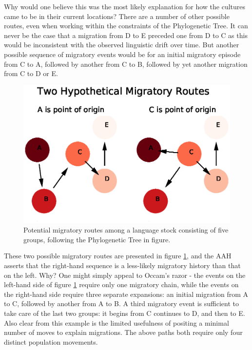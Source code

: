 \documentclass[11pt]{article}
\begin{document}
Why would one believe this was the most likely explanation for how the cultures came to be in their current locations? There are a number of other possible routes, even when working within the constraints of the Phylogenetic Tree. It can never be the case that a migration from D to E preceded one from D to C as this would be inconsistent with the observed linguistic drift over time. But another possible  sequence of migratory events would be for an initial migratory episode from C to A, followed by another from C to B, followed by yet another migration from C to D or E.

\begin{figure}
\begin{center} 
\includegraphics[width=\textwidth]{AncillaryFiles//figure2.eps} 
\caption{Potential migratory routes among a language stock consisting of five groups, following the Phylogenetic Tree in figure.} \label{fig2}
\end{center} 
\end{figure}

These two possible migratory routes are presented in figure \ref{fig2}, and the AAH asserts that the right-hand sequence is a less-likely migratory history than that on the left. Why? One might simply appeal to Occam's razor - the events on the left-hand side of figure \ref{fig2} require only one migratory chain, while the events on the right-hand side require three separate expansions: an initial migration from A to C, followed by another from A to B. A third migratory event is sufficient to take care of the last two groups: it begins from C continues to D, and then to E. Also clear from this example is the limited usefulness of positing a minimal number of moves to explain migrations. The above paths both require only four distinct population movements.  
\end{document}
